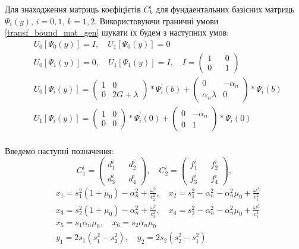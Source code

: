 Для знаходження матриць коєфіцієтів $C_k^i$ для фундаентальних базісних матриць $\Psi_i(y)$, $i=\overline{0,1}$, $k=\overline{1,2}$.
Використовуючи граничні умови \eqref{transf_bound_mat_gen} шукати їх будем з наступних умов:
\begin{align*}
    &U_0\left[ \Psi_0(y) \right] = I, \quad U_1\left[ \Psi_0(y) \right] = 0 \\
    &U_0\left[ \Psi_1(y) \right] = 0, \quad U_1\left[ \Psi_1(y) \right] = I, \quad I = \begin{pmatrix}
        1 && 0 \\
        0 && 1
    \end{pmatrix} \\
    &U_0\left[ \Psi_i(y) \right] =  \begin{pmatrix}
        1 & 0 \\
        0 & 2G + \lambda
    \end{pmatrix} * \Psi_i^{'}(b) + \begin{pmatrix}
        0 & -\alpha_n \\
        \alpha_n \lambda & 0
    \end{pmatrix} * \Psi_i(b) \\
    &U_1\left[ \Psi_i(y) \right] =  \begin{pmatrix}
        1 & 0 \\
        0 & 0
    \end{pmatrix} * \Psi_i^{'}(0) + \begin{pmatrix}
        0 & -\alpha_n \\
        0 & 1
    \end{pmatrix} * \Psi_i(0) \\
\end{align*}

Введемо наступні позначення:
\begin{equation*}
    C_1^i = \begin{pmatrix}
        d_1^i && d_2^i \\
        d_3^i && d_4^i
    \end{pmatrix}, \quad
    C_2^i = \begin{pmatrix}
        f_1^i && f_2^i \\
        f_3^i && f_4^i
    \end{pmatrix},
\end{equation*}
\begin{align*}
    &x_1 =  s_1^2 (1 + \mu_0) -\alpha_n^2 + \frac{\omega^2}{c_2^2}, \quad x_2 = s_1^2 - \alpha_n^2 - \alpha_n^2\mu_0 + \frac{\omega^2}{c_1^2} \\
    &x_3 =  s_2^2 (1 + \mu_0) -\alpha_n^2 + \frac{\omega^2}{c_2^2}, \quad x_4 = s_2^2 - \alpha_n^2 - \alpha_n^2\mu_0 + \frac{\omega^2}{c_1^2} \\
    &x_5 =  s_1 \alpha_n \mu_0, \quad x_6 = s_2 \alpha_n \mu_0 \\
    &y_1 = 2s_1 (s_1^2 - s_2^2), \quad y_2 = 2s_2 (s_2^2 - s_1^2)
\end{align*}


